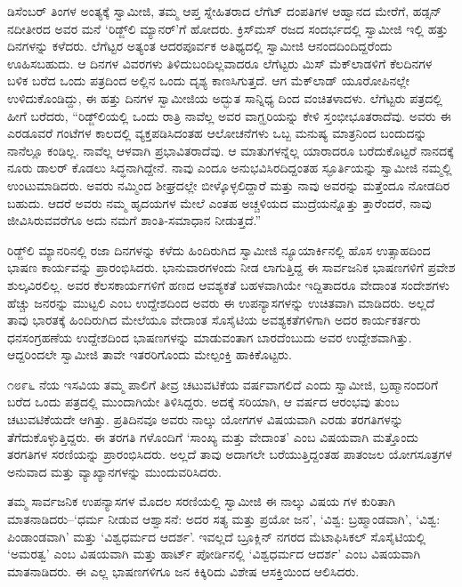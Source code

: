ಡಿಸೆಂಬರ್ ತಿಂಗಳ ಅಂತ್ಯಕ್ಕೆ ಸ್ವಾಮೀಜಿ, ತಮ್ಮ ಆಪ್ತ ಸ್ನೇಹಿತರಾದ ಲೆಗೆಟ್ ದಂಪತಿಗಳ ಆಹ್ವಾನದ ಮೇರೆಗೆ, ಹಡ್ಸನ್ ನದೀತೀರದ ಅವರ ಮನೆ ‘ರಿಡ್ಜ್​ಲಿ ಮ್ಯಾನರ್​’ಗೆ ಹೋದರು. ಕ್ರಿಸ್​ಮಸ್ ರಜದ ಸಂದರ್ಭದಲ್ಲಿ ಸ್ವಾಮೀಜಿ ಇಲ್ಲಿ ಹತ್ತು ದಿನಗಳನ್ನು ಕಳೆದರು. ಲೆಗೆಟ್ಟರ ಅತ್ಯಂತ ಆದರಪೂರ್ವಕ ಅತಿಥ್ಯದಲ್ಲಿ ಸ್ವಾಮೀಜಿ ಆನಂದದಿಂದಿದ್ದರೆಂದು ಊಹಿಸಬಹುದು. ಆ ದಿನಗಳ ವಿವರಗಳು ತಿಳಿದುಬಂದಿಲ್ಲವಾದರೂ ಲೆಗೆಟ್ಟರು ಮಿಸ್ ಮೆಕ್​ಲಾಡಳಿಗೆ ಕೆಲದಿನಗಳ ಬಳಿಕ ಬರೆದ ಒಂದು ಪತ್ರದಿಂದ ಅಲ್ಲಿನ ಒಂದು ದೃಶ್ಯ ಕಾಣಸಿಗುತ್ತದೆ. ಆಗ ಮೆಕ್​ಲಾಡ್ ಯೂರೋಪಿನಲ್ಲೇ ಉಳಿದುಕೊಂಡಿದ್ದು, ಈ ಹತ್ತು ದಿನಗಳ ಸ್ವಾಮೀಜಿಯ ಅದ್ಭುತ ಸಾನ್ನಿಧ್ಯ ದಿಂದ ವಂಚಿತಳಾದಳು. ಲೆಗೆಟ್ಟರು ಪತ್ರದಲ್ಲಿ ಹೀಗೆ ಬರೆದರು, “ರಿಡ್ಜ್​ಲಿಯಲ್ಲಿ ಒಂದು ರಾತ್ರಿ ನಾವೆಲ್ಲ ಅವರ ವಾಗ್ಝರಿಯನ್ನು ಕೇಳಿ ಸ್ತಂಭೀಭೂತರಾದೆವು. ಅವರು ಈ ಎರಡೂವರೆ ಗಂಟೆಗಳ ಕಾಲದಲ್ಲಿ ವ್ಯಕ್ತಪಡಿಸಿದಂತಹ ಆಲೋಚನೆಗಳು ಒಬ್ಬ ಮನುಷ್ಯ ಮಾತ್ರನಿಂದ ಬಂದುದನ್ನು ನಾನೆಲ್ಲೂ ಕಂಡಿಲ್ಲ. ನಾವೆಲ್ಲ ಆಳವಾಗಿ ಪ್ರಭಾವಿತರಾದೆವು. ಆ ಮಾತುಗಳನ್ನೆಲ್ಲ ಯಾರಾದರೂ ಬರೆದುಕೊಟ್ಟರೆ ನಾನದಕ್ಕೆ ನೂರು ಡಾಲರ್ ಕೊಡಲು ಸಿದ್ಧನಾಗಿದ್ದೇನೆ. ನಾವು ಎಂದೂ ಅನುಭವಿಸಿರದಿದ್ದಂತಹ ಸ್ಫೂರ್ತಿಯನ್ನು ಸ್ವಾಮೀಜಿ ನಮ್ಮಲ್ಲಿ ಉಂಟುಮಾಡಿದರು. ಅವರು ನಮ್ಮಿಂದ ಶೀಘ್ರದಲ್ಲೇ ಬೀಳ್ಕೊಳ್ಳಲಿದ್ದಾರೆ ಮತ್ತು ನಾವು ಅವರನ್ನು ಮತ್ತೆಂದೂ ನೋಡದಿರ ಬಹುದು. ಆದರೆ ಅವರು ನಮ್ಮ ಹೃದಯಗಳ ಮೇಲೆ ಎಂತಹ ಅಚ್ಚಳಿಯದ ಮುದ್ರೆಯನ್ನೊತ್ತು ತ್ತಾರೆಂದರೆ, ನಾವು ಜೀವಿಸಿರುವವರೆಗೂ ಅದು ನಮಗೆ ಶಾಂತಿ-ಸಮಾಧಾನ ನೀಡುತ್ತದೆ.”

ರಿಡ್ಜ್​ಲಿ ಮ್ಯಾನರಿನಲ್ಲಿ ರಜಾ ದಿನಗಳನ್ನು ಕಳೆದು ಹಿಂದಿರುಗಿದ ಸ್ವಾಮೀಜಿ ನ್ಯೂಯಾರ್ಕಿನಲ್ಲಿ ಹೊಸ ಉತ್ಸಾಹದಿಂದ ಭಾಷಣ ಕಾರ್ಯವನ್ನು ಪ್ರಾರಂಭಿಸಿದರು. ಭಾನುವಾರಗಳಂದು ನೀಡ ಲಾಗುತ್ತಿದ್ದ ಈ ಸಾರ್ವಜನಿಕ ಭಾಷಣಗಳಿಗೆ ಪ್ರವೇಶ ಶುಲ್ಕವಿರಲಿಲ್ಲ. ಅವರ ಕೆಲಸಕಾರ್ಯಗಳಿಗೆ ಹಣದ ಆವಶ್ಯಕತೆ ಬಹಳವಾಗಿಯೇ ಇದ್ದಿತಾದರೂ ವೇದಾಂತ ಸಂದೇಶಗಳು ಹೆಚ್ಚು ಜನರನ್ನು ಮುಟ್ಟಲಿ ಎಂಬ ಉದ್ದೇಶದಿಂದ ಅವರು ಈ ಉಪನ್ಯಾಸಗಳನ್ನು ಉಚಿತವಾಗಿ ಮಾಡಿದರು. ಅಲ್ಲದೆ ತಾವು ಭಾರತಕ್ಕೆ ಹಿಂದಿರುಗಿದ ಮೇಲೆಯೂ ವೇದಾಂತ ಸೊಸೈಟಿಯ ಅವಶ್ಯಕತೆಗಳಿಗಾಗಿ ಅದರ ಕಾರ್ಯಕರ್ತರು ಧನಸಂಗ್ರಹಣೆಯ ಉದ್ದೇಶದಿಂದ ಭಾಷಣಗಳನ್ನು ಮಾಡುವಂತಾಗ ಬಾರದೆಂಬುದು ಅವರ ಉದ್ದೇಶವಾಗಿತ್ತು. ಆದ್ದರಿಂದಲೇ ಸ್ವಾಮೀಜಿ ತಾವೇ ಇತರರಿಗೊಂದು ಮೇಲ್ಪಂಕ್ತಿ ಹಾಕಿಕೊಟ್ಟರು.

೧೮೯೬ ನೆಯ ಇಸವಿಯ ತಮ್ಮ ಪಾಲಿಗೆ ತೀವ್ರ ಚಟುವಟಿಕೆಯ ವರ್ಷವಾಗಲಿದೆ ಎಂದು ಸ್ವಾಮೀಜಿ, ಬ್ರಹ್ಮಾನಂದರಿಗೆ ಬರೆದ ಒಂದು ಪತ್ರದಲ್ಲಿ ಮುಂದಾಗಿಯೇ ತಿಳಿಸಿದ್ದರು. ಅದಕ್ಕೆ ಸರಿಯಾಗಿ, ಆ ವರ್ಷದ ಆರಂಭವು ತುಂಬ ಚಟುವಟಿಕೆಯದೇ ಆಗಿತ್ತು. ಪ್ರತಿದಿನವೂ ಅವರು ನಾಲ್ಕು ಯೋಗಗಳ ವಿಷಯವಾಗಿ ಎರಡು ತರಗತಿಗಳನ್ನು ತೆಗೆದುಕೊಳ್ಳುತ್ತಿದ್ದರು. ಈ ತರಗತಿ ಗಳೊಂದಿಗೆ ‘ಸಾಂಖ್ಯ ಮತ್ತು ವೇದಾಂತ’ ಎಂಬ ವಿಷಯವಾಗಿ ಮತ್ತೊಂದು ತರಗತಿಗಳ ಸರಣಿಯನ್ನು ಪ್ರಾರಂಭಿಸಿದರು. ಅಲ್ಲದೆ ತಾವು ಅದಾಗಲೇ ಬರೆಯುತ್ತಿದ್ದಂತಹ ಪಾತಂಜಲ ಯೋಗಸೂತ್ರಗಳ ಅನುವಾದ ಮತ್ತು ವ್ಯಾಖ್ಯಾನಗಳನ್ನು ಮುಂದುವರಿಸಿದರು.

ತಮ್ಮ ಸಾರ್ವಜನಿಕ ಉಪನ್ಯಾಸಗಳ ಮೊದಲ ಸರಣಿಯಲ್ಲಿ ಸ್ವಾಮೀಜಿ ಈ ನಾಲ್ಕು ವಿಷಯ ಗಳ ಕುರಿತಾಗಿ ಮಾತನಾಡಿದರು–‘ಧರ್ಮ ನೀಡುವ ಆಶ್ವಾಸನೆ: ಅದರ ಸತ್ಯ ಮತ್ತು ಪ್ರಯೋ ಜನ’, ‘ವಿಶ್ವ: ಬ್ರಹ್ಮಾಂಡವಾಗಿ’, ‘ವಿಶ್ವ: ಪಿಂಡಾಂಡವಾಗಿ’ ಮತ್ತು ‘ವಿಶ್ವಧರ್ಮದ ಆದರ್ಶ’. ಇವಲ್ಲದೆ ಬ್ರೂಕ್ಲಿನ್ ನಗರದ ಮೆಟಾಫಿಸಿಕಲ್ ಸೊಸೈಟಿಯಲ್ಲಿ ‘ಅಮರತ್ವ’ ಎಂಬ ವಿಷಯವಾಗಿ ಮತ್ತು ಹಾರ್ಟ್ ಪೋರ್ಡಿನಲ್ಲಿ ‘ವಿಶ್ವಧರ್ಮದ ಆದರ್ಶ’ ಎಂಬ ವಿಷಯವಾಗಿ ಮಾತನಾಡಿದರು. ಈ ಎಲ್ಲ ಭಾಷಣಗಳಿಗೂ ಜನ ಕಿಕ್ಕಿರಿದು ವಿಶೇಷ ಆಸಕ್ತಿಯಿಂದ ಆಲಿಸಿದರು.

